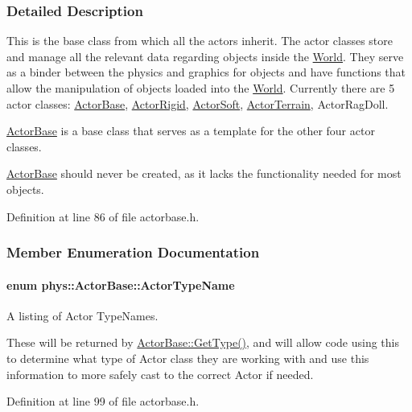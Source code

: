 \subsubsection{Detailed Description}
This is the base class from which all the actors inherit. The actor classes store and manage all the relevant data regarding objects inside the \hyperlink{classphys_1_1World}{World}. They serve as a binder between the physics and graphics for objects and have functions that allow the manipulation of objects loaded into the \hyperlink{classphys_1_1World}{World}. Currently there are 5 actor classes: \hyperlink{classphys_1_1ActorBase}{ActorBase}, \hyperlink{classphys_1_1ActorRigid}{ActorRigid}, \hyperlink{classphys_1_1ActorSoft}{ActorSoft}, \hyperlink{classphys_1_1ActorTerrain}{ActorTerrain}, ActorRagDoll. \par
 \hyperlink{classphys_1_1ActorBase}{ActorBase} is a base class that serves as a template for the other four actor classes. \par
 \hyperlink{classphys_1_1ActorBase}{ActorBase} should never be created, as it lacks the functionality needed for most objects. 

Definition at line 86 of file actorbase.h.



\subsubsection{Member Enumeration Documentation}
\hypertarget{classphys_1_1ActorBase_aff3a7c464e8ce82576073f8f891434b7}{
\paragraph[{ActorTypeName}]{\setlength{\rightskip}{0pt plus 5cm}enum {\bf phys::ActorBase::ActorTypeName}}\hfill}
\label{d8/d0f/classphys_1_1ActorBase_aff3a7c464e8ce82576073f8f891434b7}


A listing of Actor TypeNames. 

These will be returned by \hyperlink{classphys_1_1ActorBase_ab8bedea2ef0ce9194731ebeb886333ff}{ActorBase::GetType()}, and will allow code using this to determine what type of Actor class they are working with and use this information to more safely cast to the correct Actor if needed. 

Definition at line 99 of file actorbase.h.



